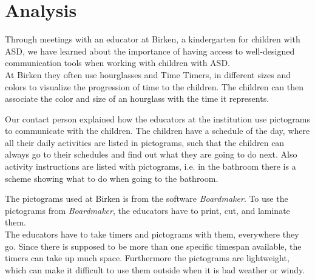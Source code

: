 \chapter{Analysis}
\label{cha:analysis}
Through meetings with an educator at Birken, a kindergarten for children with ASD, we have learned about the importance of having access to well-designed communication tools when working with children with ASD.\\

At Birken they often use hourglasses and Time Timers, in different sizes and colors to visualize the progression of time to the children. The children can then associate the color and size of an hourglass with the time it represents.

Our contact person explained how the educators at the institution use pictograms to communicate with the children. The children have a schedule of the day, where all their daily activities are listed in pictograms, such that the children can always go to their schedules and find out what they are going to do next. Also activity instructions are listed with pictograms, i.e. in the bathroom there is a scheme showing what to do when going to the bathroom.

The pictograms used at Birken is from the software \textit{Boardmaker}\cite{web:boardmaker}. To use the pictograms from \textit{Boardmaker}, the educators have to print, cut, and laminate them.\\

The educators have to take timers and pictograms with them, everywhere they go. Since there is supposed to be more than one specific timespan available, the timers can take up much space. Furthermore the pictograms are lightweight, which can make it difficult to use them outside when it is bad weather or windy.